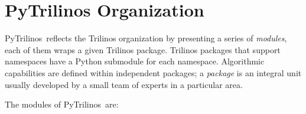 \documentclass[10pt,relax]{SANDreport}
\newcommand{\PyTrilinos}{{PyTrilinos}}
\begin{document}
\section{PyTrilinos Organization}
\label{sec:organization}

\PyTrilinos\ reflects the Trilinos organization by presenting a series
of {\sl modules}, each of them wraps a given Trilinos package.
Trilinos packages that support namespaces have a Python submodule for
each namespace.  Algorithmic capabilities are defined within
independent packages; a {\sl package} is an integral unit usually
developed by a small team of experts in a particular area.

The modules of \PyTrilinos\ are:
\end{document}
